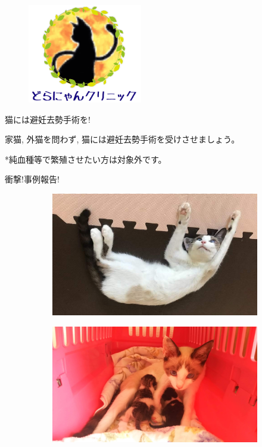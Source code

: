 \documentclass{jsarticle}
\begin{document}
\begin{figure}[htbp]
	\begin{center}
		\includegraphics[width=5cm]{Tra2.png}
	\end{center}
\end{figure}

\Huge
\vspace{-10pt}
  猫には避妊去勢手術を!

\Large
  家猫, 外猫を問わず, 猫には避妊去勢手術を受けさせましょう。

  *純血種等で繁殖させたい方は対象外です。


\vspace{30pt}
\huge
  衝撃!事例報告!

	\begin{figure}[htbp]
		\centering
		\begin{subfigure}{0.4\columnwidth}
			\centering
			\includegraphics[width=\columnwidth]{2.jpg}
		\end{subfigure}
		\begin{subfigure}{0.4\columnwidth}
			\centering
			\includegraphics[width=\columnwidth]{1.jpg}
		\end{subfigure}
	\end{figure}
\end{document}
